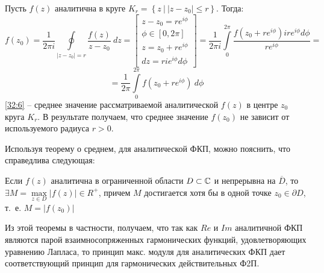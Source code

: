 \documentclass[../../main.tex]{subfiles}
\begin{document}
\begin{corollary*}	
	Пусть $f(z)$ аналитична в круге $K_r = \left\lbrace z \  \big| \ |z-z_0| \le 
	r   \right\rbrace $. Тогда:
	\[   f(z_0) = \frac{1}{2 \pi i} \oint \limits_{|z-z_0| = r} 
	\frac{f(z)}{z-z_0} \ dz = \left[\begin{gathered} z-z_0 = r e^{i\phi} \\
	\phi \in [0,2\pi]  \\
	z = z_0 + r e^{i\phi} \\
	dz = r i e^{i\phi} d \phi
	\end{gathered} \right] = \frac{1}{2 \pi i} \int \limits_{0}^{2\pi} 
	\frac{f(z_0 +r e^{i\phi} ) i r e^{i\phi} d\phi}{r e^{i\phi}}  =     \]
	\begin{equation}
	\label{32:6}
	= \frac{1}{2 \pi } \int \limits_{0}^{2\pi} f(z_0 +r e^{i\phi} ) \ d \phi
	\end{equation}
	\eqref{32:6} \--- среднее значение рассматриваемой аналитической $f(z)$ в 
	центре $z_0$ круга $K_r$. В результате получаем, что среднее значение 
	$f(z_0)$ не зависит от используемого радиуса $r>0$.
\end{corollary*}
\begin{remark}
	Используя теорему о среднем, для аналитической ФКП, можно пояснить, что 
	справедлива следующая:
\end{remark}
\begin{theorem}
	Если $f(z)$ аналитична в ограниченной области $D \subset \mathbb{C}$ и непрерывна на 
	$\overline{D}$, то $\exists M = \max \limits_{z\in D} |f(z)| \in R^+$, причем 
	$M$ достигается хотя бы в одной точке $z_0 \in \partial D$, т.~е. $M = 
	|f(z_0)|$
\end{theorem}		
Из этой теоремы в частности, получаем, что так как $Re$ и $Im$ аналитичной ФКП 
являются парой взаимносопряженных гармонических функций, удовлетворяющих 
уравнению Лапласа, то принцип макс. модуля для аналитических ФКП дает 
соответствующий принцип для гармонических действительных Ф2П.
	
\end{document}
